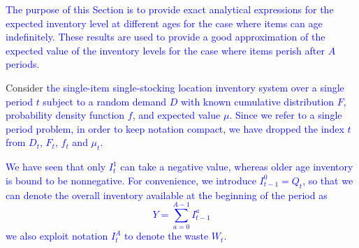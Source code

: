 \documentclass{tPRS2e}
\newcommand{\blue}{\textcolor{blue}}
\begin{document}
\blue{The purpose of this Section is to provide exact analytical expressions for the expected inventory level at different ages for the case where items can age indefinitely. These results are used to provide a good approximation of the expected value of the inventory levels for the case where items perish after $A$ periods.}

Consider \blue{the single-item single-stocking location inventory system over a single period $t$ subject to a random demand $D$ with known cumulative distribution $F$, probability density function $f$, and expected value $\mu$. Since we refer to a single period problem, in order to keep notation compact, we have dropped the index $t$ from $D_t$, $F_t$, $f_t$ and $\mu_t$.} %

\blue{We have seen that only $I^1_{t}$ can take a negative value, whereas older age inventory is bound to be nonnegative. For convenience, we introduce $I^0_{t-1}=Q_t$, so that we can denote the overall inventory available at the beginning of the period as
\[Y=\sum_{a=0}^{A-1} I^a_{t-1}\]
we also exploit notation $I^A_{t}$ to denote the waste $W_t$.}	
 
\end{document}
